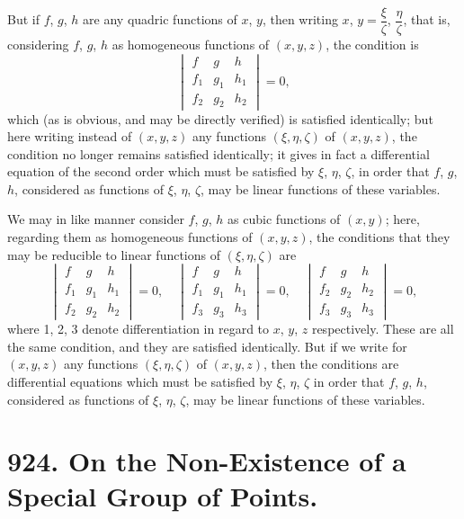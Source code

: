 \documentclass[12pt,a4paper]{article}
\begin{document}
But if $f$, $g$, $h$ are any quadric functions of $x$, $y$, then writing $x$, $y = \dfrac{\xi}{\zeta}$,
$\dfrac{\eta}{\zeta}$, that is, considering $f$, $g$, $h$ as homogeneous functions of $(x, y, z)$, the
condition is
\[
\begin{vmatrix}
f & g & h\\
f_1 & g_1 & h_1\\
f_2 & g_2 & h_2
\end{vmatrix} = 0,
\]
which (as is obvious, and may be directly verified) is satisfied identically; but here
writing instead of $(x, y, z)$ any functions $(\xi, \eta, \zeta)$ of $(x, y, z)$, the condition no longer
remains satisfied identically; it gives in fact a differential equation of the second
order which must be satisfied by $\xi$, $\eta$, $\zeta$, in order that $f$, $g$, $h$, considered as functions
of $\xi$, $\eta$, $\zeta$, may be linear functions of these variables.

\newpage
We may in like manner consider $f$, $g$, $h$ as cubic functions of $(x, y)$; here, regarding
them as homogeneous functions of $(x, y, z)$, the conditions that they may be reducible
to linear functions of $(\xi, \eta, \zeta)$ are
\[
\begin{vmatrix}
f & g & h\\
f_1 & g_1 & h_1\\
f_2 & g_2 & h_2
\end{vmatrix} = 0,
\quad
\begin{vmatrix}
f & g & h\\
f_1 & g_1 & h_1\\
f_3 & g_3 & h_3
\end{vmatrix} = 0,
\quad
\begin{vmatrix}
f & g & h\\
f_2 & g_2 & h_2\\
f_3 & g_3 & h_3
\end{vmatrix} = 0,
\]
where 1, 2, 3 denote differentiation in regard to $x$, $y$, $z$ respectively. These are all
the same condition, and they are satisfied identically. But if we write for $(x, y, z)$
any functions $(\xi, \eta, \zeta)$ of $(x, y, z)$, then the conditions are differential equations which
must be satisfied by $\xi$, $\eta$, $\zeta$ in order that $f$, $g$, $h$, considered as functions of $\xi$, $\eta$, $\zeta$,
may be linear functions of these variables.



\newpage
\section*{924. On the Non-Existence of a Special Group of Points.}
\end{document}
